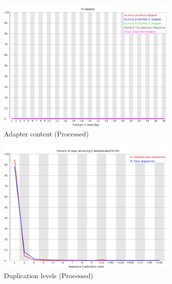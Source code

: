 \documentclass[UTF8]{ctexart}
\begin{document}

\begin{figure}[!htb]
	\centering
	\includegraphics[width=0.8\textwidth]{img/SRR14325859_FastQC_Processed_img/adapter_content.png}	
	\caption{Adapter content (Processed)\protect}    
\end{figure}

\begin{figure}[!htb]
	\centering
	\includegraphics[width=0.8\textwidth]{img/SRR14325859_FastQC_Processed_img/duplication_levels.png}	
	\caption{Duplication levels (Processed)\protect}    
\end{figure}
\end{document}
